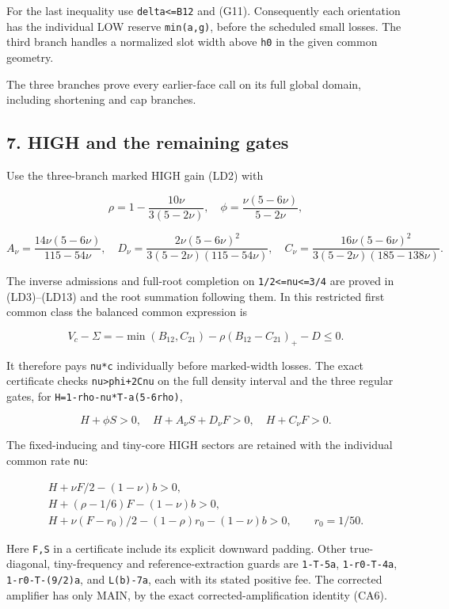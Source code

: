 For the last inequality use \texttt{delta\textless{}=B12} and (G11). Consequently each orientation has the individual LOW reserve \texttt{min(a,g)}, before the scheduled small losses. The third branch handles a normalized slot width above \texttt{h0} in the given common geometry.

The three branches prove every earlier-face call on its full global domain, including shortening and cap branches.

\hypertarget{sources:high-and-the-remaining-gates}{%
\subsection{7. HIGH and the remaining gates}\label{sources:high-and-the-remaining-gates}}

Use the three-branch marked HIGH gain (LD2) with

\[
 \rho=1-\frac{10\nu}{3(5-2\nu)},\quad
 \phi=\frac{\nu(5-6\nu)}{5-2\nu},
\]

\[
 A_\nu=\frac{14\nu(5-6\nu)}{115-54\nu},\quad
 D_\nu=\frac{2\nu(5-6\nu)^2}
              {3(5-2\nu)(115-54\nu)},\quad
 C_\nu=\frac{16\nu(5-6\nu)^2}
              {3(5-2\nu)(185-138\nu)}.
\tag{G14}
\]

The inverse admissions and full-root completion on \texttt{1/2\textless{}=nu\textless{}=3/4} are proved in (LD3)--(LD13) and the root summation following them. In this restricted first common class the balanced common expression is

\[
 V_c-\Sigma=-\min(B_{12},C_{21})
             -\rho(B_{12}-C_{21})_+-D\le0.
\tag{G15}
\]

It therefore pays \texttt{nu*c} individually before marked-width losses. The exact certificate checks \texttt{nu\textgreater{}phi+2Cnu} on the full density interval and the three regular gates, for \texttt{H=1-rho-nu*T-a(5-6rho)},

\[
 H+\phi S>0,\quad H+A_\nu S+D_\nu F>0,
 \quad H+C_\nu F>0.
\tag{G16}
\]

The fixed-inducing and tiny-core HIGH sectors are retained with the individual common rate \texttt{nu}:

\[
 \begin{gathered}
 H+\nu F/2-(1-\nu)b>0,\\
 H+(\rho-1/6)F-(1-\nu)b>0,\\
 H+\nu(F-r_0)/2-(1-\rho)r_0-(1-\nu)b>0,
 \qquad r_0=1/50.
 \end{gathered}
\tag{G17}
\]

Here \texttt{F,S} in a certificate include its explicit downward padding. Other true-diagonal, tiny-frequency and reference-extraction guards are \texttt{1-T-5a}, \texttt{1-r0-T-4a}, \texttt{1-r0-T-(9/2)a}, and \texttt{L(b)-7a}, each with its stated positive fee. The corrected amplifier has only MAIN, by the exact corrected-amplification identity (CA6).

